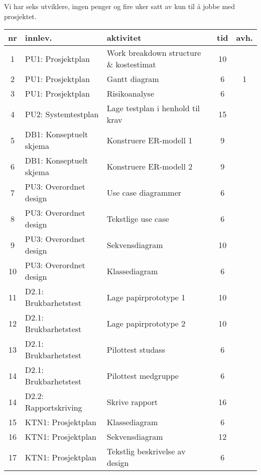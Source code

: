 
Vi har seks utviklere, ingen penger og fire uker satt av kun til å jobbe med prosjektet.

\begin{table}
    \centering
	\begin{tabularx}{1.3\textwidth}{|c|l|X|c|c|}
	\hline
	\textbf{nr}& \textbf{innlev.}& \textbf{aktivitet}& \textbf{tid}& \textbf{avh.}\\ \hline
	1 & PU1: Prosjektplan & Work breakdown structure \& kostestimat & 10 & \\ \hline
	2 & PU1: Prosjektplan  & Gantt diagram & 6 & 1 \\ \hline
	3 & PU1: Prosjektplan  & Risikoanalyse & 6 & \\ \hline
	4 & PU2: Systemtestplan & Lage testplan i henhold til krav & 15 & \\ \hline
	5 & DB1: Konseptuelt skjema & Konstruere ER-modell 1 & 9 & \\ \hline
	6 & DB1: Konseptuelt skjema & Konstruere ER-modell 2 & 9 & \\ \hline
	7 & PU3: Overordnet design & Use case diagrammer & 6 & \\ \hline
	8 & PU3: Overordnet design  & Tekstlige use case & 6 & \\ \hline
	9 & PU3: Overordnet design  & Sekvensdiagram & 10 & \\ \hline
	10 & PU3: Overordnet design  & Klassediagram & 6 & \\ \hline
	11 & D2.1: Brukbarhetstest & Lage papirprototype 1& 10 & \\ \hline
	12 & D2.1: Brukbarhetstest & Lage papirprototype 2& 10 & \\ \hline
	13 & D2.1: Brukbarhetstest & Pilottest studass & 6 & \\ \hline
	14 & D2.1: Brukbarhetstest & Pilottest medgruppe & 6 & \\ \hline
	14 & D2.2: Rapportskriving & Skrive rapport & 16 & \\ \hline
	15 & KTN1: Prosjektplan & Klassediagram & 6 & \\ \hline
	16 & KTN1: Prosjektplan & Sekvensdiagram & 12 & \\ \hline
	17 & KTN1: Prosjektplan & Tekstlig beskrivelse av design & 6 & \\ \hline

\end{tabularx}
\end{table}
